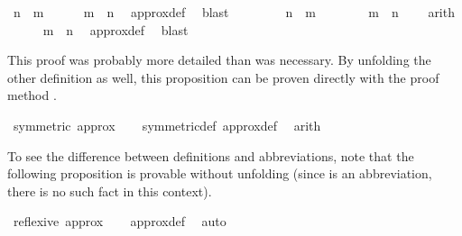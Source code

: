 \begin{isabellebody}
\ {\isacartoucheopen}n\ {\isacharequal}{\kern0pt}\ m{\isacartoucheclose}\isanewline
\ \ \ \ \isamarkupfalse%
\ {\isacartoucheopen}m\ {\isasymapprox}\ n{\isacartoucheclose}\ \isamarkupfalse%
\ approx{\isacharunderscore}{\kern0pt}def\ \isamarkupfalse%
\ blast\isanewline
\ \ \isamarkupfalse%
\isanewline
\ \ \ \ \isamarkupfalse%
\ {\isacartoucheopen}n\ {\isacharequal}{\kern0pt}\ m\ {\isacharplus}{\kern0pt}\ {}{\isacartoucheclose}\isanewline
\ \ \ \ \isamarkupfalse%
\ {\isacartoucheopen}m\ {\isacharequal}{\kern0pt}\ n\ {\isacharminus}{\kern0pt}\ {}{\isacartoucheclose}\ \isamarkupfalse%
\ arith\isanewline
\ \ \ \ \isamarkupfalse%
\ {\isacartoucheopen}m\ {\isasymapprox}\ n{\isacartoucheclose}\ \isamarkupfalse%
\ approx{\isacharunderscore}{\kern0pt}def\ \isamarkupfalse%
\ blast\isanewline
\ \ \isamarkupfalse%
\isanewline
{}\isamarkupfalse%
%
\endisatagvisible
{\isafoldvisible}%
%
\isadelimvisible
%
\endisadelimvisible
%
\begin{isamarkuptext}%
This proof was probably more detailed than was necessary. By unfolding the other definition as well, this proposition can be proven directly with the proof method .%
\end{isamarkuptext}\isamarkuptrue%
%
\isadelimvisible
%
\endisadelimvisible
%
\isatagvisible
{}\isamarkupfalse%
\ {\isacartoucheopen}symmetric\ approx{\isacartoucheclose}\isanewline
\ \ \isamarkupfalse%
\ symmetric{\isacharunderscore}{\kern0pt}def\ approx{\isacharunderscore}{\kern0pt}def\ \isamarkupfalse%
\ arith%
\endisatagvisible
{\isafoldvisible}%
%
\isadelimvisible
%
\endisadelimvisible
%
\begin{isamarkuptext}%
To see the difference between definitions and abbreviations, note that the following proposition is provable without unfolding  (since  is an abbreviation, there is no such fact in this context).%
\end{isamarkuptext}\isamarkuptrue%
%
\isadelimvisible
%
\endisadelimvisible
%
\isatagvisible
{}\isamarkupfalse%
\ {\isacartoucheopen}reflexive\ approx{\isacartoucheclose}\isanewline
\ \ \isamarkupfalse%
\ approx{\isacharunderscore}{\kern0pt}def\ \isamarkupfalse%
\ auto%
\endisatagvisible
{\isafoldvisible}%

\end{isabellebody}
